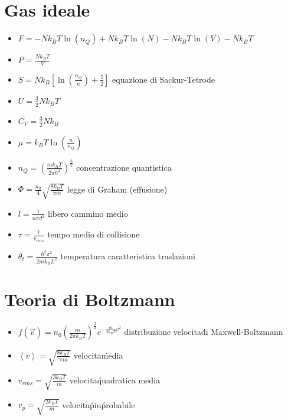\documentclass[a4paper]{article}
\begin{document}
    \section{Gas ideale}
        \begin{itemize}
            \item $F=-Nk_BT\ln(n_Q)+Nk_BT\ln(N)-Nk_BT\ln(V)-Nk_BT$
            \item $P=\frac{Nk_BT}{V}$
            \item $S=Nk_B\left[\ln\left(\frac{n_Q}{n}\right)+\frac{5}{2}\right]$ equazione di Sackur-Tetrode
            \item $U=\frac{3}{2}Nk_BT$
            \item $C_V=\frac{3}{2}Nk_B$
            \item $\mu=k_BT\ln\left(\frac{n}{n_Q}\right)$
            \item $n_Q=\left(\frac{mk_BT}{2\pi\hbar^2}\right)^{\frac{3}{2}}$ concentrazione quantistica
            \item $\Phi=\frac{n_0}{4}\sqrt{\frac{8k_BT}{\pi m}}$ legge di Graham (effusione)
            \item $l=\frac{1}{n\pi d^2}$ libero cammino medio
            \item $\tau=\frac{l}{v_{rms}}$ tempo medio di collisione
            \item $\theta_t=\frac{\hbar^2\pi^2}{2mk_BL^2}$ temperatura caratteristica traslazioni
        \end{itemize} 

    \section{Teoria di Boltzmann}
        \begin{itemize}
            \item $f(\vec{v})=n_0\left(\frac{m}{2\pi k_BT}\right)^{\frac{3}{2}}e^{-\frac{m}{2k_BT}v^2}$ distribuzione velocita\' di Maxwell-Boltzmann
            \item $\left\langle v \right\rangle=\sqrt{\frac{8k_BT}{\pi m}}$ velocita\' media
            \item $v_{rms}=\sqrt{\frac{3k_BT}{m}}$ velocita\' quadratica media
            \item $v_{p}=\sqrt{\frac{2k_BT}{m}}$ velocita\' piu\' probabile
        \end{itemize}
\end{document}

